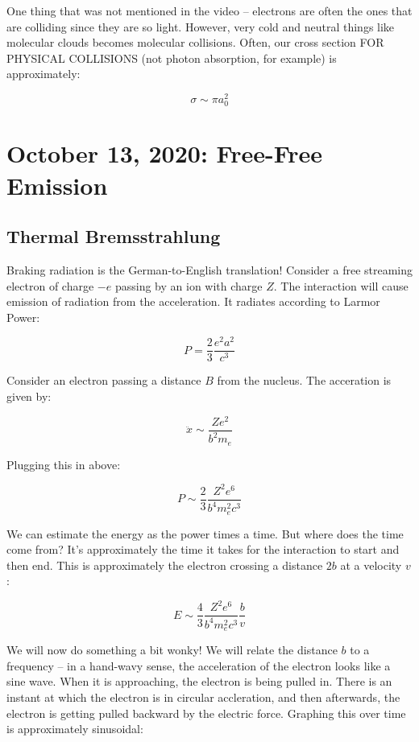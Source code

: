 \documentclass{article}
\newcommand{\be}{\begin{equation}}
\newcommand{\ee}{\end{equation}}
\begin{document}
One thing that was not mentioned in the video -- electrons are often the ones that are colliding since they are so light. However, very cold and neutral things like molecular clouds becomes molecular collisions. Often, our cross section FOR PHYSICAL COLLISIONS (not photon absorption, for example) is approximately:

\be
    \sigma \sim \pi a_0^2
\ee

\newpage
\section{October 13, 2020: Free-Free Emission}

\subsection{Thermal Bremsstrahlung}

Braking radiation is the German-to-English translation! Consider a free streaming electron of charge $-e$ passing by an ion with charge $Z$. The interaction will cause emission of radiation from the acceleration. It radiates according to Larmor Power:

$$
P = \frac23\frac{e^2 a^2}{c^3}
$$

Consider an electron passing a distance $B$ from the nucleus. The acceration is given by:

$$
\ddot{x} \sim \frac{Ze^2}{b^2 m_e}
$$

Plugging this in above:

$$
P \sim \frac{2}{3} \frac{Z^2 e^6}{b^4 m_e^2 c^3}
$$

We can estimate the energy as the power times a time. But where does the time come from? It's approximately the time it takes for the interaction to start and then end. This is approximately the electron crossing a distance $2b$ at a velocity $v$:


$$
E \sim \frac{4}{3}\frac{Z^2 e^6}{b^4 m_e^2 c^3} \frac{b}{v}
$$

We will now do something a bit wonky! We will relate the distance $b$ to a frequency -- in a hand-wavy sense, the acceleration of the electron looks like a sine wave. When it is approaching, the electron is being pulled in. There is an instant at which the electron is in circular accleration, and then afterwards, the electron is getting pulled backward by the electric force. Graphing this over time is approximately sinusoidal:
\end{document}
